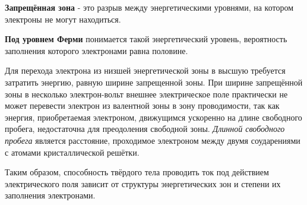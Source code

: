 	\par \textbf{Запрещённая зона} - это разрыв между энергетическими уровнями, на котором электроны не могут находиться.
	
	\par \textbf{Под уровнем Ферми} понимается такой энергетический уровень, вероятность заполнения которого электронами равна половине.
	
	\par Для перехода электрона из низшей энергетической зоны в высшую требуется затратить энергию, равную ширине запрещенной зоны. При ширине запрещённой зоны в несколько электрон-вольт внешнее электрическое поле практически не может перевести электрон из валентной зоны в зону проводимости, так как энергия, приобретаемая электроном, движущимся ускоренно на длине свободного пробега, недостаточна для преодоления свободной зоны. \textit{Длинной свободного пробега} является расстояние, проходимое электроном между двумя соударениями с атомами кристаллической решётки. 
    
    \par Таким образом, способность твёрдого тела проводить ток под действием электрического поля зависит от структуры энергетических зон и степени их заполнения электронами.
    
